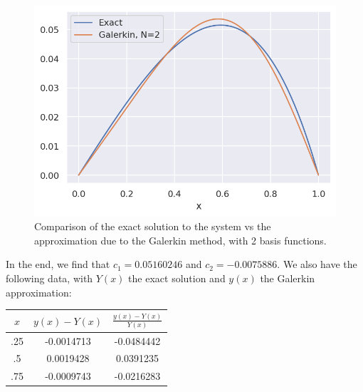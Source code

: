 \documentclass[12pt]{article}
\begin{document}
\begin{figure}[h]
\centering
\includegraphics[width=.75\textwidth]{plt.png}
\caption{Comparison of the exact solution to the system vs the approximation due to the Galerkin method, with 2 basis functions.}
\end{figure}

In the end, we find that $c_1 = 0.05160246$ and $c_2 = -0.0075886$. We also have the following data, with $Y(x)$ the exact solution and $y(x)$ the Galerkin approximation:

\begin{center}
\begin{tabular}{ c | c | c }
 $x$ & $y(x) - Y(x)$ & $\frac{y(x) - Y(x)}{Y(x)}$ \\ \hline
 .25 & -0.0014713 & -0.0484442 \\  
 .5  &  0.0019428 &  0.0391235 \\
 .75 & -0.0009743 & -0.0216283
\end{tabular}
\end{center}
\end{document}
